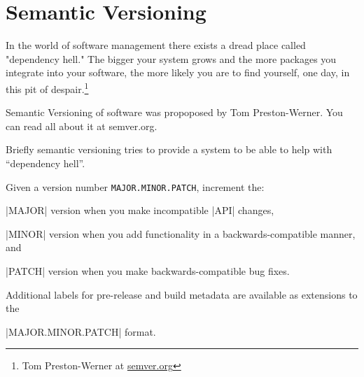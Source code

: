 \chapter{Semantic Versioning}

In the world of software management there exists a dread place called "dependency hell." The bigger your system grows and the more packages you integrate into your software, the more likely you are to find yourself, one day, in this pit of despair.\footnote{Tom Preston-Werner at \protect\url{semver.org}}

Semantic Versioning of software was propoposed by Tom Preston-Werner. You can read all about it
at semver.org.

Briefly semantic versioning tries to provide a system to be able to help with \enquote{dependency hell}.

Given a version number \texttt{MAJOR.MINOR.PATCH}, increment the:

|MAJOR| version when you make incompatible |API| changes,

|MINOR| version when you add functionality in a backwards-compatible manner, and

|PATCH| version when you make backwards-compatible bug fixes.

Additional labels for pre-release and build metadata are available as extensions to the 

|MAJOR.MINOR.PATCH| format.